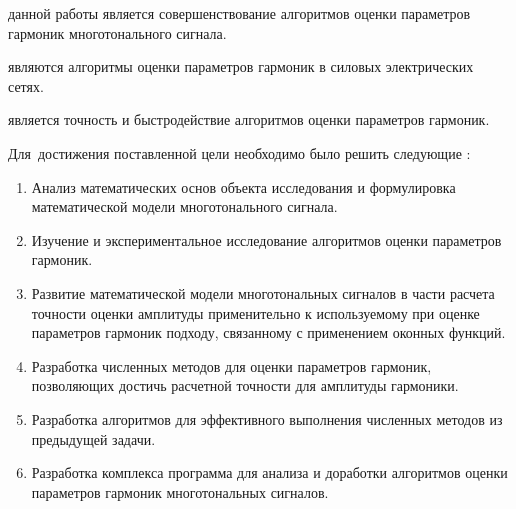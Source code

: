 {\aim} данной работы является совершенствование алгоритмов оценки параметров гармоник многотонального сигнала.

{\researchObject} являются алгоритмы оценки параметров гармоник в силовых электрических сетях.

{\researchSubject} является точность и быстродействие алгоритмов оценки параметров гармоник.

Для~достижения поставленной цели необходимо было решить следующие {\tasks}:
\begin{enumerate}
  \item Анализ математических основ объекта исследования и формулировка математической модели многотонального сигнала.
  
  \item Изучение и экспериментальное исследование алгоритмов оценки параметров гармоник.
  
  \item Развитие математической модели многотональных сигналов в части расчета точности оценки амплитуды применительно к используемому при оценке параметров гармоник подходу, связанному с применением оконных функций.
  
  \item Разработка численных методов для оценки параметров гармоник, позволяющих достичь расчетной точности для амплитуды гармоники.
  
  \item Разработка алгоритмов для эффективного выполнения численных методов из предыдущей задачи.
  
  \item Разработка комплекса программа для анализа и доработки алгоритмов оценки параметров гармоник многотональных сигналов.
\end{enumerate}


{\novelty}
 
